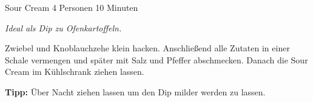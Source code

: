 \documentclass[
  DIV=11,%
  pagesize,%
  fontsize=11pt,%
  paper=a4,%
]{scrartcl}
\begin{document}
\begin{recipe}{Sour Cream} {4 Personen} {10 Minuten}

\freeform
\textit{Ideal als Dip zu Ofenkartoffeln.}


Zwiebel und Knoblauchzehe klein hacken.
Anschließend alle Zutaten in einer Schale vermengen und später mit Salz und Pfeffer abschmecken.
Danach die Sour Cream im Kühlschrank ziehen lassen.

\freeform
\hrulefill

\freeform 
\textbf{Tipp:}
Über Nacht ziehen lassen um den Dip milder werden zu lassen.

\end{recipe}
\end{document}
